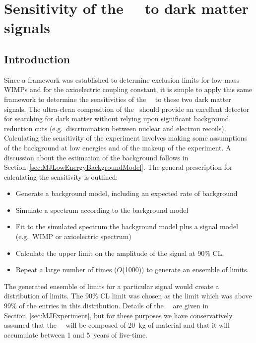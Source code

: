 	\section{Sensitivity of the \MJ~\minmod~to dark matter signals}
	\label{sec:MJSensitivity}
	
		\subsection{Introduction}
		\label{sec:MJSensitivityIntro}
	Since a framework was established to determine exclusion limits for low-mass WIMPs and for the axioelectric coupling constant, it is simple to apply this same framework to determine the sensitivities of the \MJ~\minmod~to these two dark matter signals.  The ultra-clean composition of the \minmod~should provide an excellent detector for searching for dark matter without relying upon significant background reduction cuts (e.g.~discrimination between nuclear and electron recoils).  Calculating the sensitivity of the experiment involves making some assumptions of the background at low energies and of the makeup of the experiment.  A discussion about the estimation of the background follows in Section~\ref{sec:MJLowEnergyBackgroundModel}.  The general prescription for calculating the sensitivity is outlined:
	
		\begin{itemize}
			\item Generate a background model, including an expected rate of background
			\item Simulate a spectrum according to the background model
			\item Fit to the simulated spectrum the background model plus a signal model (e.g.~WIMP or axioelectric spectrum)
			\item Calculate the upper limit on the amplitude of the signal at 90\% CL.
			\item Repeat a large number of times ($O$(1000)) to generate an ensemble of limits.
		\end{itemize}	
		
The generated ensemble of limits for a particular signal would create a distribution of limits.  The 90\% CL limit was chosen as the limit which was above 99\% of the entries in this distribution.  Details of the \MJ~\minmod~are given in Section~\ref{sec:MJExperiment}, but for these purposes we have conservatively assumed that the \MJ~\minmod~will be composed of 20~kg of material and that it will accumulate between 1 and 5~years of live-time.  
	
